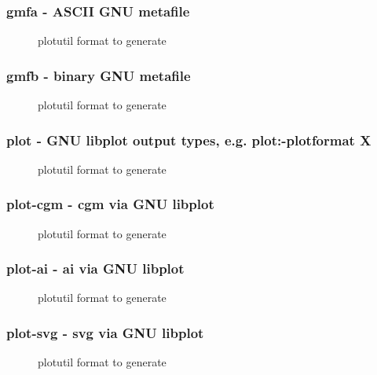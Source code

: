\documentclass[english,a4paper]{article}
\begin{document}
\subsubsection{gmfa - ASCII GNU metafile }
\begin{description}
\item[]
plotutil format to generate


\end{description}
\subsubsection{gmfb - binary GNU metafile }
\begin{description}
\item[]
plotutil format to generate


\end{description}
\subsubsection{plot - GNU libplot output types, e.g. plot:-plotformat X}
\begin{description}
\item[]
plotutil format to generate


\end{description}
\subsubsection{plot-cgm - cgm via GNU libplot}
\begin{description}
\item[]
plotutil format to generate


\end{description}
\subsubsection{plot-ai - ai via GNU libplot}
\begin{description}
\item[]
plotutil format to generate


\end{description}
\subsubsection{plot-svg - svg via GNU libplot}
\begin{description}
\item[]
plotutil format to generate


\end{description}
\end{document}
